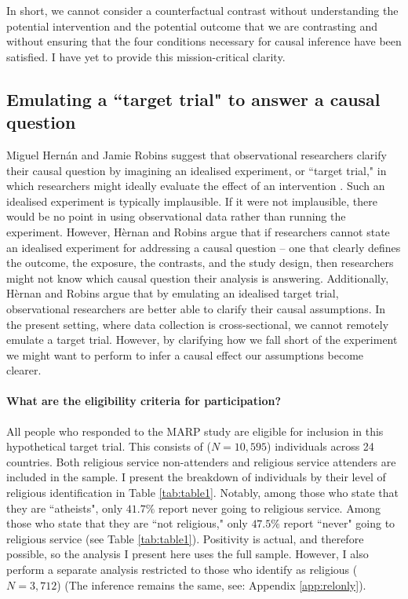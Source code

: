 \documentclass[]{interact}
\theoremstyle{plain}%
\theoremstyle{definition}
\theoremstyle{remark}
\begin{document}
In short, we cannot consider a counterfactual contrast without understanding the potential intervention and the potential outcome that we are contrasting and without ensuring that the four conditions necessary for causal inference have been satisfied. I have yet to provide this mission-critical clarity.

\subsection{Emulating a “target trial" to answer a causal question} 

Miguel Hern\'{a}n and Jamie Robins suggest that observational researchers clarify their causal question by imagining an idealised experiment, or “target trial," in which researchers might ideally evaluate the effect of an intervention \citep{hernan_causal_2020, hernan_specifying_2016, hernan_using_2016}. 
Such an idealised experiment is typically implausible. If it were not implausible, there would be no point in using observational data rather than running the experiment. However, H\`{e}rnan and Robins argue that if researchers cannot state an idealised experiment for addressing a causal question -- one that clearly defines the outcome, the exposure, the contrasts, and the study design, then researchers might not know which causal question their analysis is answering. Additionally, H\`{e}rnan and Robins argue that by emulating an idealised target trial, observational researchers are better able to clarify their causal assumptions. In the present setting, where data collection is cross-sectional, we cannot remotely emulate a target trial. However, by clarifying how we fall short of the experiment we might want to perform to infer a causal effect our assumptions become clearer.


\paragraph*{What are the eligibility criteria for participation?} 

All people who responded to the MARP study are eligible for inclusion in this hypothetical target trial. This consists of ($N=10,595$) individuals across 24 countries. Both religious service non-attenders and religious service attenders are included in the sample. I present the breakdown of individuals by their level of religious identification in Table \ref{tab:table1}. Notably, among those who state that they are “atheists", only $41.7\%$ report never going to religious service. Among those who state that they are “not religious," only $47.5\%$ report “never" going to religious service (see Table \ref{tab:table1}). Positivity is actual, and therefore possible, so the analysis I present here uses the full sample. However, I also perform a separate analysis restricted to those who identify as religious ($N = 3,712$) (The inference remains the same, see: Appendix \ref{app:relonly}). 
\end{document}
